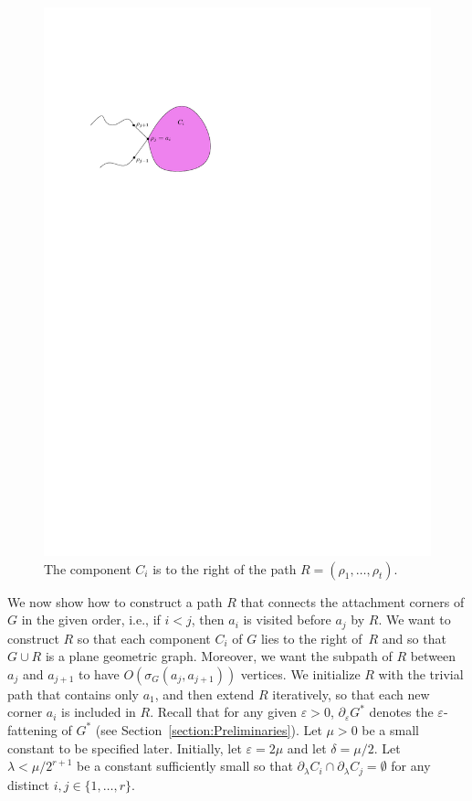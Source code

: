 \documentclass[11pt]{patmorin}
\begin{document}
\begin{figure}
\centering
  \includegraphics{img/right-of}
  \caption{The component $C_i$ is to the right of the path $R=(\rho_1,\ldots,\rho_t)$.}
   \label{figure:right-of}
\end{figure}

We now show how to construct a path $R$ that connects the attachment corners of $G$ in the given order, i.e., if $i < j$, then $a_i$ is visited before $a_j$ by $R$. We want to construct $R$ so that each component $C_i$ of $G$ lies to the right of~$R$ and so that $G\cup R$ is a plane geometric graph.
Moreover, we want the subpath of $R$ between $a_j$ and $a_{j+1}$ to have $O(\sigma_G(a_j, a_{j+1}))$ vertices. 
We initialize $R$ with the trivial path that contains only $a_1$, and then extend $R$ iteratively, so that each new corner $a_i$ is included in $R$.
Recall that  for any given $\varepsilon >0$, $\partial_\varepsilon G^*$ denotes the $\varepsilon$-fattening of $G^*$ (see Section~\ref{section:Preliminaries}).
Let $\mu>0$ be a small constant to be specified later.
Initially, let $\varepsilon = 2\mu$ and let $\delta = \mu/2$. Let $\lambda < \mu/2^{r+1}$ be a constant sufficiently small so that $\partial_\lambda C_i \cap \partial_\lambda C_j = \emptyset$ for any distinct $i,j\in\{1,\ldots,r\}$.
\end{document}
